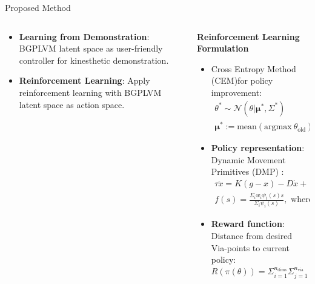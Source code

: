 \documentclass[final,hyperref={pdfpagelabels=false}]{beamer}
\begin{document}
\begin{frame}[t]
\begin{columns}[t]
\begin{column}{0.96\linewidth}
\begin{block}{Proposed Method}
\begin{columns}[t]
\begin{column}{0.34\linewidth}
          \begin{itemize}
            \item \small \textbf{Learning from Demonstration}: BGPLVM latent space as user-friendly controller for kinesthetic demonstration.
            \item \small \textbf{Reinforcement Learning}: Apply reinforcement learning with BGPLVM latent space as action space.
          \end{itemize}
        \end{column}

        \begin{column}{0.33\linewidth}
          \centering \large \textbf{Reinforcement Learning Formulation}

          \begin{itemize}
            \item Cross Entropy Method (CEM)\footnotemark[6] for policy improvement:
              \begin{equation*}
                \begin{array}{c}
                  \theta^* \sim \mathcal{N} (\theta | \mathbf{\mu}^*, \Sigma^{*})\\
                  \mathbf{\mu}^* := \text{mean}(\text{argmax}~ \theta_{\text{old}}),~~\Sigma^{*} := \text{var}(\text{argmax} ~\theta_{\text{old}})
                \end{array}
              \end{equation*}
            \item \textbf{Policy representation}: Dynamic Movement Primitives (DMP) \footnotemark[7]:
              \begin{equation*}
                \begin{array}{c}
                  \tau \ddot{x} = K(g-x) -D\dot{x} + (g - x_0)f\\
                  \displaystyle f(s) = \frac{\Sigma_i w_i \psi_i(s)s}{\Sigma_i \psi_i(s)}, \text{ where } \tau \dot{s} = - \alpha s
                \end{array}
              \end{equation*}
            \item \textbf{Reward function}: Distance from desired Via-points to current policy:
              \begin{equation*}
                R(\pi(\theta)) = \Sigma_{i = 1}^{n_{\text{dims}}} \Sigma_{j = 1}^{n_{\text{via}}} \| V_{i,j} - \pi_i(\theta, t_{i,j}) \|^2
              \end{equation*}
          \end{itemize}


\end{column}
\end{columns}
\end{block}
\end{column}
\end{columns}
\end{frame}
\end{document}
